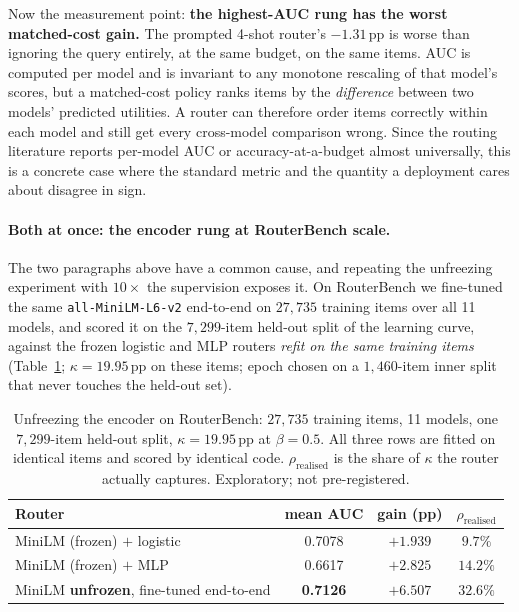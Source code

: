 \documentclass[10pt]{article}
\newcommand{\pp}{\,\text{pp}}
\begin{document}
Now the measurement point: \textbf{the highest-AUC rung has the
worst matched-cost gain.} The prompted 4-shot router's $-1.31\pp$ is worse than
ignoring the query entirely, at the same budget, on the same items. AUC is
computed per model and is invariant to any monotone rescaling of that model's
scores, but a matched-cost policy ranks items by the \emph{difference} between
two models' predicted utilities. A router can therefore order items correctly
within each model and still get every cross-model comparison wrong. Since the
routing literature reports per-model AUC or accuracy-at-a-budget almost
universally, this is a concrete case where the standard metric and the quantity
a deployment cares about disagree in sign.

\paragraph{Both at once: the encoder rung at RouterBench scale.} The two
paragraphs above have a common cause, and repeating the unfreezing experiment
with $10\times$ the supervision exposes it. On RouterBench we fine-tuned the
same \texttt{all-MiniLM-L6-v2} end-to-end on $27{,}735$ training items over all
11 models, and scored it on the $7{,}299$-item held-out split of the learning
curve, against the frozen logistic and MLP routers \emph{refit on the same
training items} (Table~\ref{tab:rbenc}; $\kappa=19.95\pp$ on these items;
epoch chosen on a $1{,}460$-item inner split that never touches the held-out
set).

\begin{table}[t]\centering\small
\caption{Unfreezing the encoder on RouterBench: $27{,}735$ training items, 11
models, one $7{,}299$-item held-out split, $\kappa=19.95\pp$ at $\beta=0.5$.
All three rows are fitted on identical items and scored by identical code.
$\rho_{\text{realised}}$ is the share of $\kappa$ the router actually captures.
Exploratory; not pre-registered.}
\label{tab:rbenc}
\begin{tabular}{lccc}
\toprule
Router & mean AUC & gain (pp) & $\rho_{\text{realised}}$ \\
\midrule
MiniLM (frozen) $+$ logistic & 0.7078 & $+1.939$ & $9.7\%$ \\
MiniLM (frozen) $+$ MLP      & 0.6617 & $+2.825$ & $14.2\%$ \\
MiniLM \textbf{unfrozen}, fine-tuned end-to-end & \textbf{0.7126} & $\mathbf{+6.507}$ & $\mathbf{32.6\%}$ \\
\bottomrule
\end{tabular}
\end{table}
\end{document}
